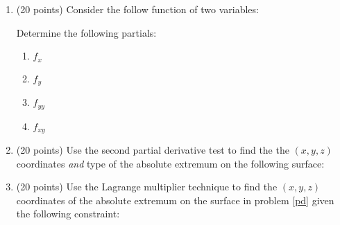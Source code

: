 \documentclass[letterpaper,12pt,fleqn]{article}
\begin{document}
\begin{enumerate}[left=0pt]
\item (20 points) Consider the follow function of two variables:

  \bigskip

  \begin{center}
  \end{center}
  
  \bigskip

  Determine the following partials:
  \begin{enumerate}[label={\alph*)}]
  \item \(f_x\)

    \vspace{3in}
    
  \item \(f_y\)

    \vspace{1in}

  \item \(f_{yy}\)

    \vspace{1in}

  \item \(f_{xy}\)
  \end{enumerate}

  \newpage

\item{\label{pd}} (20 points) Use the second partial derivative test to find the the \((x,y,z)\) coordinates \emph{and} type of
  the absolute extremum on the following surface:

  \bigskip

  \begin{center}
    \scalebox{1.25}{\(\displaystyle z=x^2+4x+y^2-2y+10\)}
  \end{center}

  \bigskip

  \newpage

\item{\label{lm}} (20 points) Use the Lagrange multiplier technique to find the \((x,y,z)\) coordinates of the absolute
  extremum on the surface in problem \ref{pd} given the following constraint:

  \bigskip

  \begin{center}
    \scalebox{1.25}{\(\displaystyle 2x-y=0\)}
  \end{center}


\end{enumerate}
\end{document}

